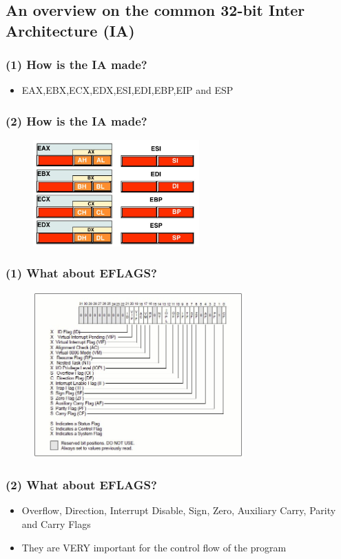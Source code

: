 \documentclass[]{beamer}
\begin{document}
	\subsection{An overview on the common 32-bit Inter Architecture (IA)}
		\begin{frame}
			\frametitle{(1) How is the IA made?}
			\begin{itemize}
				\item{ EAX,EBX,ECX,EDX,ESI,EDI,EBP,EIP and ESP }
			\end{itemize}
		\end{frame}
		\begin{frame}
			\frametitle{(2) How is the IA made?}
					\begin{figure}
						\includegraphics[height=1.6in]{images/registers.jpeg}
						\label{Registers Division}
					\end{figure}
		\end{frame}
		\begin{frame}
			\frametitle{(1) What about EFLAGS?}
			\begin{figure}
				\includegraphics[height=2.5in]{images/eflags.jpeg}
				\label{Eflags idea}
			\end{figure}
		\end{frame}
		\begin{frame}
			\frametitle{(2) What about EFLAGS?}
			\begin{itemize}
				\item{Overflow, Direction, Interrupt Disable, Sign, Zero, Auxiliary Carry, Parity and Carry Flags}
				\item{They are VERY important for the control flow of the program }				
			\end{itemize}
		\end{frame}
\end{document}

